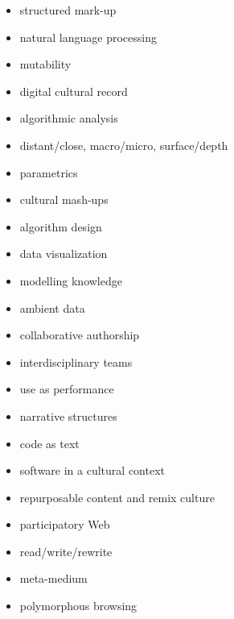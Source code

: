 \begin{multicols}{2}\raggedright
\begin{itemize}
  \item structured mark-up
  \item	natural language processing
  \item	mutability
  \item	digital cultural record
  \item	algorithmic analysis
  \item distant/close, macro/micro, surface/depth
  \item parametrics
  \item	cultural mash-ups
  \item	algorithm design
  \item data visualization
  \item	modelling knowledge
  \item	ambient data
  \item	collaborative authorship
  \item	interdisciplinary teams
  \item	use as performance
  \item narrative structures
  \item	code as text
  \item	software in a cultural context
  \item repurposable content and remix culture
  \item participatory Web
  \item	read/write/rewrite
  \item	meta-medium
  \item	polymorphous browsing
\end{itemize}
\end{multicols}



